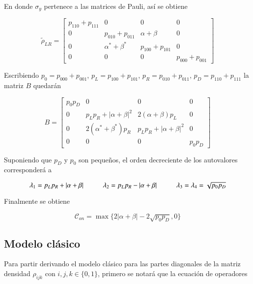 \begin{appendixs}
En donde $\sigma_{y}$ pertenece a las matrices de Pauli, así se obtiene

\begin{equation*}
    \tilde{\rho}_{LR} = 
    \begin{bmatrix}
        p_{110}+p_{111} & 0 & 0 & 0  \\
        0 & p_{010} + p_{011} & \alpha + \beta & 0  \\
        0 & \alpha^{*} +\beta^{*} & p_{100} + p_{101} & 0  \\
        0 & 0 & 0 & p_{000} + p_{001} 
        \end{bmatrix}
\end{equation*}

Escribiendo $p_{0}=p_{000}+p_{001}$, $p_{L}=p_{100} + p_{101}$, $p_{R}=p_{010}+p_{011}$, $p_{D}=p_{110}+p_{111}$ la matriz $B$ quedarán

\begin{equation*}
    B = 
    \begin{bmatrix}
        p_{0}p_{D} & 0 & 0 & 0  \\
        0 & p_{L}p_{R}+|\alpha+\beta|^{2} & 2(\alpha + \beta)p_{L} & 0  \\
        0 & 2(\alpha^{*} +\beta^{*})p_{R} & p_{L}p_{R}+|\alpha+\beta|^{2}  & 0  \\
        0 & 0 & 0 & p_{0}p_{D}
        \end{bmatrix}
\end{equation*}

Suponiendo que $p_{D}$ y $p_{0}$ son pequeños, el orden decreciente de los autovalores corresponderá a

\begin{equation*}
    \lambda_{1} = p_{L}p_{R} + |\alpha + \beta| \hspace{10mm}  \lambda_{2} = p_{L}p_{R} - |\alpha + \beta| \hspace{10mm} \lambda_{3}=\lambda_{4} = \sqrt{p_{0}p_{D}}
\end{equation*}

Finalmente se obtiene

\begin{equation*}
    \mathcal{C}_{on} = \max\{ 2|\alpha+\beta| - 2\sqrt{p_{0}p_{D}},0\}
\end{equation*}

\label{appendix5final}

\subsection{Modelo clásico}
Para partir derivando el modelo clásico para las partes diagonales de la matriz densidad $\rho_{ijk}$ con $i,j,k \in \{0,1\}$, primero se notará que la ecuación de operadores


\end{appendixs}
